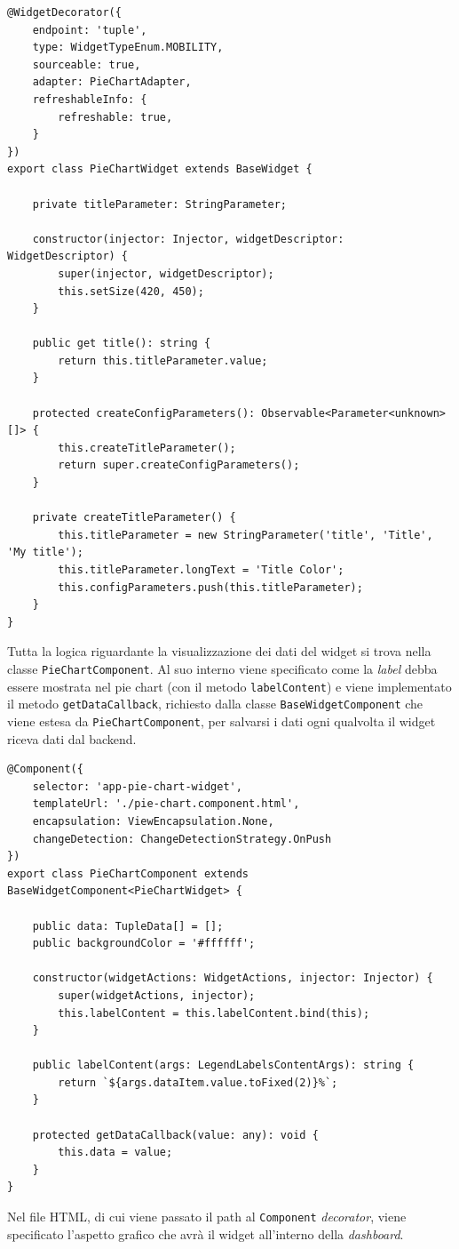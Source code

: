 \begin{lstlisting}[caption={Classe PieChartWidget}, style=javaScriptCode]
@WidgetDecorator({
    endpoint: 'tuple',
    type: WidgetTypeEnum.MOBILITY,
    sourceable: true,
    adapter: PieChartAdapter,
    refreshableInfo: {
        refreshable: true,
    }
})
export class PieChartWidget extends BaseWidget {

    private titleParameter: StringParameter;

    constructor(injector: Injector, widgetDescriptor: WidgetDescriptor) {
        super(injector, widgetDescriptor);
        this.setSize(420, 450);
    }

    public get title(): string {
        return this.titleParameter.value;
    }

    protected createConfigParameters(): Observable<Parameter<unknown>[]> {
        this.createTitleParameter();
        return super.createConfigParameters();
    }

    private createTitleParameter() {
        this.titleParameter = new StringParameter('title', 'Title', 'My title');
        this.titleParameter.longText = 'Title Color';
        this.configParameters.push(this.titleParameter);
    }
}

\end{lstlisting}
Tutta la logica riguardante la visualizzazione dei dati del widget si trova nella classe \verb|PieChartComponent|. Al suo interno viene specificato come la \textit{label} debba essere mostrata nel pie chart (con il metodo \verb|labelContent|) e viene implementato il metodo \verb|getDataCallback|, richiesto dalla classe \verb|BaseWidgetComponent| che viene estesa da \verb|PieChartComponent|, per salvarsi i dati ogni qualvolta il widget riceva dati dal backend.

\begin{lstlisting}[caption={Classe PieChartComponent}, style=javaScriptCode]
@Component({
    selector: 'app-pie-chart-widget',
    templateUrl: './pie-chart.component.html',
    encapsulation: ViewEncapsulation.None,
    changeDetection: ChangeDetectionStrategy.OnPush
})
export class PieChartComponent extends BaseWidgetComponent<PieChartWidget> {

    public data: TupleData[] = [];
    public backgroundColor = '#ffffff';

    constructor(widgetActions: WidgetActions, injector: Injector) {
        super(widgetActions, injector);
        this.labelContent = this.labelContent.bind(this);
    }

    public labelContent(args: LegendLabelsContentArgs): string {
        return `${args.dataItem.value.toFixed(2)}%`;
    }

    protected getDataCallback(value: any): void {
        this.data = value;
    }
}
\end{lstlisting}
Nel file HTML, di cui viene passato il path al \verb|Component| \textit{decorator}, viene specificato l'aspetto grafico che avrà il widget all'interno della \textit{dashboard}.

